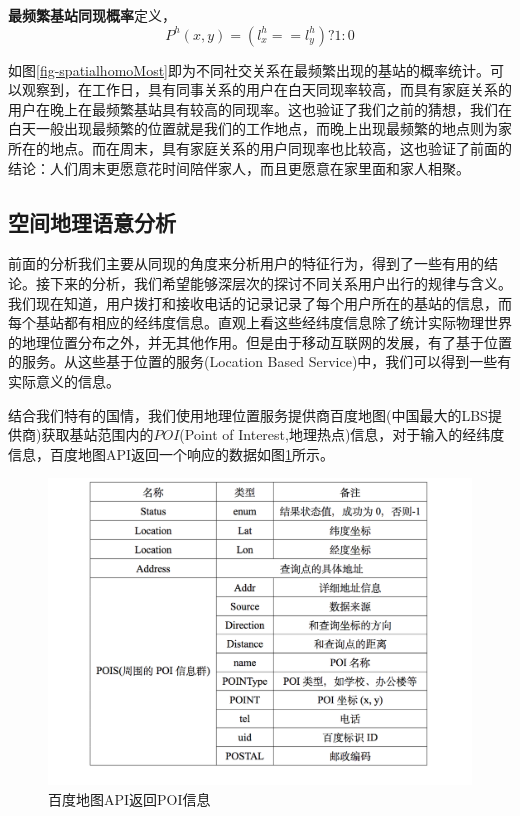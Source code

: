 \begin{definition}
    \label{spatial-homoMost-concept}
    \textbf{最频繁基站同现概率}定义，
    \begin{equation}
        P^{h}(x,y) = (l_x^h == l_y^h)? 1:0 
    \end{equation}
\end{definition}

如图\ref{fig-spatialhomoMost}即为不同社交关系在最频繁出现的基站的概率统计。可以观察到，在工作日，具有同事关系的用户在白天同现率较高，而具有家庭关系的用户在晚上在最频繁基站具有较高的同现率。这也验证了我们之前的猜想，我们在白天一般出现最频繁的位置就是我们的工作地点，而晚上出现最频繁的地点则为家所在的地点。而在周末，具有家庭关系的用户同现率也比较高，这也验证了前面的结论：人们周末更愿意花时间陪伴家人，而且更愿意在家里面和家人相聚。



\subsection{空间地理语意分析}

前面的分析我们主要从同现的角度来分析用户的特征行为，得到了一些有用的结论。接下来的分析，我们希望能够深层次的探讨不同关系用户出行的规律与含义。我们现在知道，用户拨打和接收电话的记录记录了每个用户所在的基站的信息，而每个基站都有相应的经纬度信息。直观上看这些经纬度信息除了统计实际物理世界的地理位置分布之外，并无其他作用。但是由于移动互联网的发展，有了基于位置的服务。从这些基于位置的服务(Location Based Service)中，我们可以得到一些有实际意义的信息。

结合我们特有的国情，我们使用地理位置服务提供商百度地图(中国最大的LBS提供商)获取基站范围内的$POI$(Point of Interest,地理热点)信息，对于输入的经纬度信息，百度地图API返回一个响应的数据如图\ref{fig-baidu-poi}所示。



\begin{figure}[ht]
    \centering
    \includegraphics[scale=1, width=\textwidth]{figure/baiduAPI.PNG}
    \caption{百度地图API返回POI信息}
    \label{fig-baidu-poi}
\end{figure}




